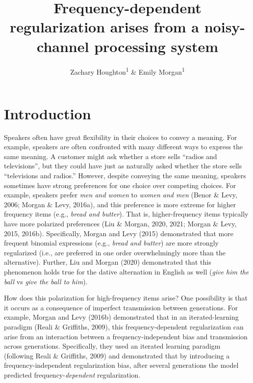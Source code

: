 \documentclass[
  jou,floatsintext]{apa6}
\title{Frequency-dependent regularization arises from a noisy-channel processing system}
\author{Zachary Houghton\textsuperscript{1} \& Emily Morgan\textsuperscript{1}}
\date{}
\affiliation{\vspace{0.5cm}\textsuperscript{1} University of California, Davis}
\begin{document}
\maketitle

\section{Introduction}\label{introduction}

Speakers often have great flexibility in their choices to convey a meaning. For example, speakers are often confronted with many different ways to express the same meaning. A customer might ask whether a store sells ``radios and televisions'', but they could have just as naturally asked whether the store sells ``televisions and radios.'' However, despite conveying the same meaning, speakers sometimes have strong preferences for one choice over competing choices. For example, speakers prefer \emph{men and women} to \emph{women and men} (Benor \& Levy, 2006; Morgan \& Levy, 2016a), and this preference is more extreme for higher frequency items (e.g., \emph{bread and butter}). That is, higher-frequency items typically have more polarized preferences (Liu \& Morgan, 2020, 2021; Morgan \& Levy, 2015, 2016b). Specifically, Morgan and Levy (2015) demonstrated that more frequent binomial expressions (e.g., \emph{bread and butter}) are more strongly regularized (i.e., are preferred in one order overwhelmingly more than the alternative). Further, Liu and Morgan (2020) demonstrated that this phenomenon holds true for the dative alternation in English as well (\emph{give him the ball} vs \emph{give the ball to him}).

How does this polarization for high-frequency items arise? One possibility is that it occurs as a consequence of imperfect transmission between generations. For example, Morgan and Levy (2016b) demonstrated that in an iterated-learning paradigm (Reali \& Griffiths, 2009), this frequency-dependent regularization can arise from an interaction between a frequency-independent bias and transmission across generations. Specifically, they used an iterated learning paradigm (following Reali \& Griffiths, 2009) and demonstrated that by introducing a frequency-independent regularization bias, after several generations the model predicted frequency-\emph{dependent} regularization.
\end{document}

